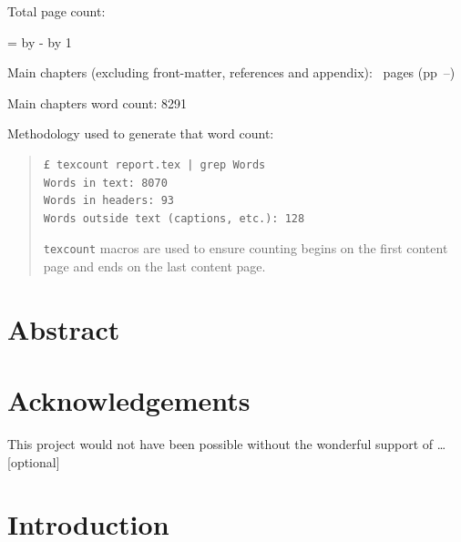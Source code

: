 \documentclass[12pt,a4paper,twoside]{report}
\newif\ifsubmission %
\begin{document}
\begin{sffamily}
\newpage

Total page count: \pageref{lastpage}

\makeatletter
\@tempcnta=\relax%
\advance\@tempcnta by -%
\advance\@tempcnta by 1%
\xdef\contentpages{\the\@tempcnta}%
\makeatother

Main chapters (excluding front-matter, references and appendix):
\contentpages~pages
(pp~\pageref{firstcontentpage}--\pageref{lastcontentpage})

Main chapters word count: 8291

Methodology used to generate that word count:

\begin{quote}
\begin{verbatim}
£ texcount report.tex | grep Words
Words in text: 8070
Words in headers: 93
Words outside text (captions, etc.): 128
\end{verbatim}

\texttt{texcount} macros are used to ensure counting begins on the first content page and ends on the last content page.
\end{quote}

\end{sffamily}

\onehalfspacing

\chapter*{Abstract}


\ifsubmission\else

\chapter*{Acknowledgements}

This project would not have been possible without the wonderful
support of \ldots [optional]

\fi
\cleardoublepage %

\setcounter{tocdepth}{1} %
\tableofcontents


\chapter{Introduction}
\label{firstcontentpage} %
\label{chap:introduction}
\end{document}
